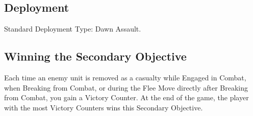 
\label{Carnage}


\subsection*{Deployment}

Standard Deployment Type: Dawn Assault.


\subsection*{Winning the Secondary Objective}

Each time an enemy unit is removed as a casualty while Engaged in Combat, when Breaking from Combat, or during the Flee Move directly after Breaking from Combat, you gain a Victory Counter. At the end of the game, the player with the most Victory Counters wins this Secondary Objective.
